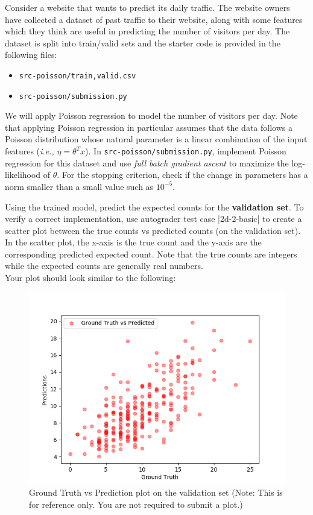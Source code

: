 \item {}

Consider a website that wants to predict its daily traffic. The website owners have collected a dataset of past traffic to their website, along with some features which they think are useful in
predicting the number of visitors per day. The dataset is split into train/valid sets and the starter code is provided in the following files:
\begin{center}
    \begin{itemize}
        \item 	\texttt{src-poisson/{train,valid}.csv}
        \item   \texttt{src-poisson/submission.py}
    \end{itemize}
\end{center}
We will apply Poisson regression to model the number of visitors per day. Note that applying Poisson regression in particular assumes that the data follows a Poisson distribution whose natural parameter is a linear combination of the input features (\emph{i.e.,} $\eta = \theta^T x$). In \texttt{src-poisson/submission.py}, implement Poisson regression for this dataset and use \emph{full batch gradient ascent} to maximize the log-likelihood of $\theta$. For the stopping criterion, check if the change in parameters has a norm smaller than a small value such as $10^{-5}$.

Using the trained model, predict the expected counts for the \textbf{validation set}.  To verify a correct implementation, use autograder test case |2d-2-basic| to create a scatter plot between the true counts vs predicted counts (on the validation set). In the scatter plot, the x-axis is the true count and the y-axis are the corresponding predicted expected count. Note that the true counts are integers while the expected counts are generally real numbers.\\

Your plot should look similar to the following:

\begin{figure}[H]
	\centering
	\vspace{-2mm}
	\includegraphics[width=0.65\linewidth]{02-poisson/poisson_val.png}
	\caption{Ground Truth vs Prediction plot on the validation set (Note: This is for reference only.  You are not required to submit a plot.)}
\end{figure}

